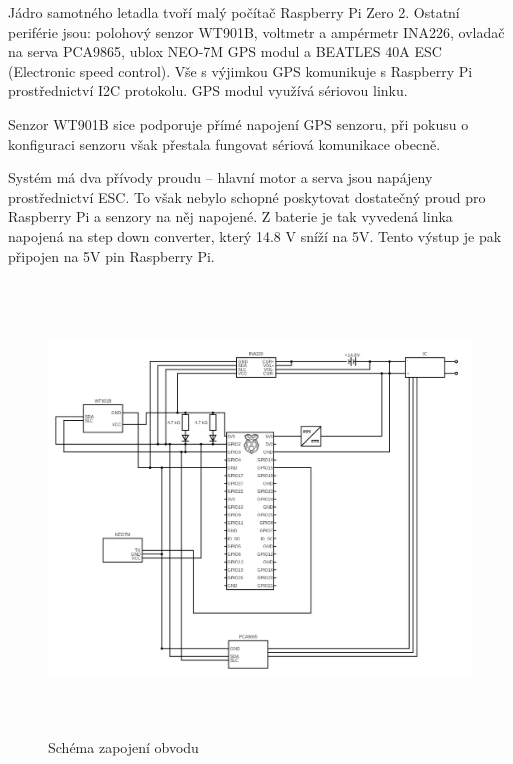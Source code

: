 \documentclass[a4paper,oneside,12pt]{report}
\begin{document}
Jádro samotného letadla tvoří malý počítač Raspberry Pi Zero 2.
Ostatní periférie jsou: polohový senzor WT901B, voltmetr a ampérmetr INA226, ovladač na serva PCA9865, ublox NEO-7M GPS modul a BEATLES 40A ESC (Electronic speed control).
Vše s výjimkou GPS komunikuje s Raspberry Pi prostřednictví I2C protokolu.
GPS modul využívá sériovou linku.

Senzor WT901B sice podporuje přímé napojení GPS senzoru, při pokusu o konfiguraci senzoru však přestala fungovat sériová komunikace obecně.

Systém má dva přívody proudu -- hlavní motor a serva jsou napájeny prostřednictví ESC.
To však nebylo schopné poskytovat dostatečný proud pro Raspberry Pi a senzory na něj napojené.
Z baterie je tak vyvedená linka napojená na step down converter, který 14.8 V sníží na 5V.
Tento výstup je pak připojen na 5V pin Raspberry Pi.

\begin{figure}[h]
  \centering
  \includegraphics[height=12cm]{../img/schema.png}
  \caption[Schéma zapojení obvodu]{Schéma zapojení obvodu}
\end{figure}

\newpage
\end{document}

